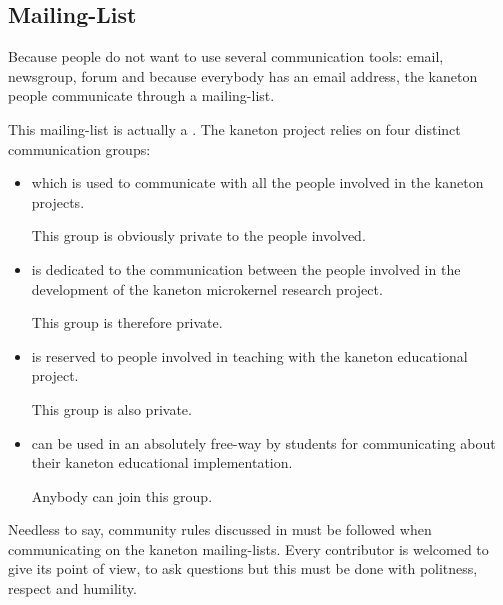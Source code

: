 %
%
%
%
%
%

%
%

\subsection{Mailing-List}
\label{section:mailing-list}

Because people do not want to use several communication tools: email,
newsgroup, forum \etc{} and because everybody has an email address, the
kaneton people communicate through a mailing-list.

This mailing-list is actually a . The kaneton
project relies on four distinct communication groups:

\begin{itemize}
  \item
     which is used to communicate with all the
    people involved in the kaneton projects.

    \-

    This group is obviously private to the people involved.
  \item
     is dedicated to the communication between the
    people involved in the development of the kaneton microkernel research
    project.

    \-

    This group is therefore private.
  \item
     is reserved to people involved in teaching
    with the kaneton educational project.

    \-

    This group is also private.
  \item
     can be used in an absolutely free-way by
    students for communicating about their kaneton educational implementation.

    \-

    Anybody can join this group.
\end{itemize}

Needless to say, community rules discussed in  must be followed when communicating on the kaneton
mailing-lists. Every contributor is welcomed to give its point of view, to
ask questions \etc{} but this must be done with politness, respect and
humility.

